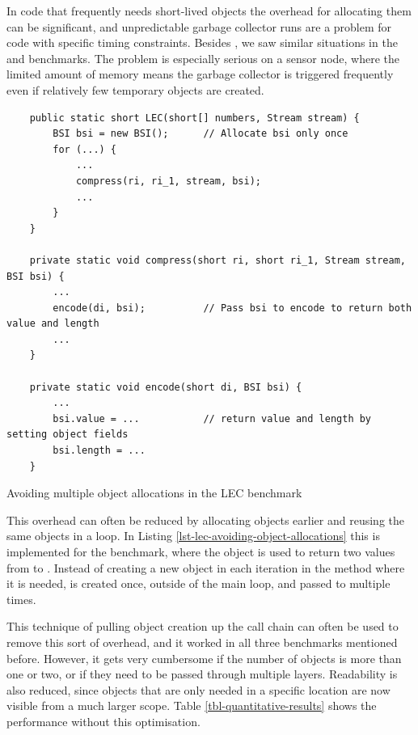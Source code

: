 In code that frequently needs short-lived objects the overhead for allocating them can be significant, and unpredictable garbage collector runs are a problem for code with specific timing constraints. Besides , we saw similar situations in the  and  benchmarks. The problem is especially serious on a sensor node, where the limited amount of memory means the garbage collector is triggered frequently even if relatively few temporary objects are created.

\begin{listing}
\begin{verbatim}
    public static short LEC(short[] numbers, Stream stream) {
        BSI bsi = new BSI();      // Allocate bsi only once
        for (...) {
            ...
            compress(ri, ri_1, stream, bsi);
            ...
        }
    }

    private static void compress(short ri, short ri_1, Stream stream, BSI bsi) {
        ...
        encode(di, bsi);          // Pass bsi to encode to return both value and length
        ...
    }

    private static void encode(short di, BSI bsi) {
        ...
        bsi.value = ...           // return value and length by setting object fields
        bsi.length = ...
    }
\end{verbatim}
\caption{Avoiding multiple object allocations in the LEC benchmark}
\label{lst-lec-avoiding-object-allocations}
\end{listing}

This overhead can often be reduced by allocating objects earlier and reusing the same objects in a loop. In Listing \ref{lst-lec-avoiding-object-allocations} this is implemented for the  benchmark, where the  object is used to return two values from  to . Instead of creating a new object in each iteration in the  method where it is needed,  is created once, outside of the main loop, and passed to  multiple times.

This technique of pulling object creation up the call chain can often be used to remove this sort of overhead, and it worked in all three benchmarks mentioned before. However, it gets very cumbersome if the number of objects is more than one or two, or if they need to be passed through multiple layers. Readability is also reduced, since objects that are only needed in a specific location are now visible from a much larger scope. Table \ref{tbl-quantitative-results} shows the performance without this optimisation.

